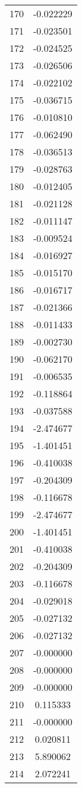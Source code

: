 \documentclass[12pt]{article}
\begin{document}
\begin{longtable}{@{}cc@{}}
170 & -0.022229 \\
171 & -0.023501 \\
172 & -0.024525 \\
173 & -0.026506 \\
174 & -0.022102 \\
175 & -0.036715 \\
176 & -0.010810 \\
177 & -0.062490 \\
178 & -0.036513 \\
179 & -0.028763 \\
180 & -0.012405 \\
181 & -0.021128 \\
182 & -0.011147 \\
183 & -0.009524 \\
184 & -0.016927 \\
185 & -0.015170 \\
186 & -0.016717 \\
187 & -0.021366 \\
188 & -0.011433 \\
189 & -0.002730 \\
190 & -0.062170 \\
191 & -0.006535 \\
192 & -0.118864 \\
193 & -0.037588 \\
194 & -2.474677 \\
195 & -1.401451 \\
196 & -0.410038 \\
197 & -0.204309 \\
198 & -0.116678 \\
199 & -2.474677 \\
200 & -1.401451 \\
201 & -0.410038 \\
202 & -0.204309 \\
203 & -0.116678 \\
204 & -0.029018 \\
205 & -0.027132 \\
206 & -0.027132 \\
207 & -0.000000 \\
208 & -0.000000 \\
209 & -0.000000 \\
210 & 0.115333 \\
211 & -0.000000 \\
212 & 0.020811 \\
213 & 5.890062 \\
214 & 2.072241 \\

\end{longtable}
\end{document}
